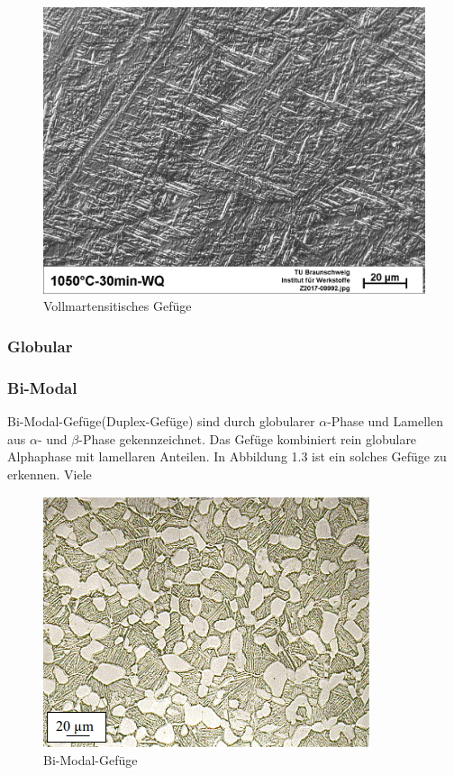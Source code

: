 \documentclass[a4paper, 11pt]{tubsreprt}
\begin{document}
\begin{figure}
\centering
\includegraphics[scale=0.5]{Bilder/Vollmartensit.jpg}
\caption{Vollmartensitisches Gefüge}
\label{fig3}
\end{figure}
\subsubsection{Globular}


\subsubsection{Bi-Modal}
Bi-Modal-Gefüge(Duplex-Gefüge) sind durch globularer $\alpha$-Phase und Lamellen aus $\alpha$- und $\beta$-Phase gekennzeichnet. Das Gefüge kombiniert rein globulare Alphaphase mit lamellaren Anteilen. In Abbildung 1.3 ist ein solches Gefüge zu erkennen. Viele 
\begin{figure}
\centering
\includegraphics[scale=1]{Bilder/Duplexgefuege.PNG}
\caption[Bi-Modal-Gefüge]{Bi-Modal-Gefüge\cite{Werkstoffdesign2012}}
\label{fig4}
\end{figure}
\end{document}
